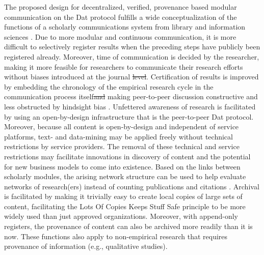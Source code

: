 \documentclass[publications,article,submit,moreauthors,pdftex,10pt,a4paper]{Definitions/mdpi}
\providecommand{\DIFaddtex}[1]{{\protect\color{blue}\uwave{#1}}} %
\providecommand{\DIFdeltex}[1]{{\protect\color{red}\sout{#1}}}                      %
\providecommand{\DIFaddbegin}{} %
\providecommand{\DIFaddend}{} %
\providecommand{\DIFdelbegin}{} %
\providecommand{\DIFdelend}{} %
\providecommand{\DIFadd}[1]{\texorpdfstring{\DIFaddtex{#1}}{#1}} %
\providecommand{\DIFdel}[1]{\texorpdfstring{\DIFdeltex{#1}}{}} %
\newcommand{\DIFscaledelfig}{0.5}
\newlength{\DIFdelgraphicswidth} %
\newlength{\DIFdelgraphicsheight} %
\newcommand{\DIFaddincludegraphics}[2][]{{\color{blue}\fbox{\DIFOincludegraphics[#1]{#2}}}} %
\newcommand{\DIFdelincludegraphics}[2][]{%
\sbox{\DIFdelgraphicsbox}{\DIFOincludegraphics[#1]{#2}}%
\settoboxwidth{\DIFdelgraphicswidth}{\DIFdelgraphicsbox} %
\settoboxtotalheight{\DIFdelgraphicsheight}{\DIFdelgraphicsbox} %
\scalebox{\DIFscaledelfig}{%
\parbox[b]{\DIFdelgraphicswidth}{\usebox{\DIFdelgraphicsbox}\\[-\baselineskip] \rule{\DIFdelgraphicswidth}{0em}}\llap{\resizebox{\DIFdelgraphicswidth}{\DIFdelgraphicsheight}{%
\setlength{\unitlength}{\DIFdelgraphicswidth}%
\begin{picture}(1,1)%
\thicklines\linethickness{2pt} %
{\color[rgb]{1,0,0}\put(0,0){\framebox(1,1){}}}%
{\color[rgb]{1,0,0}\put(0,0){\line( 1,1){1}}}%
{\color[rgb]{1,0,0}\put(0,1){\line(1,-1){1}}}%
\end{picture}%
}\hspace*{3pt}}} %
} %
\DeclareRobustCommand{\DIFaddbegin}{\DIFOaddbegin \let\includegraphics\DIFaddincludegraphics} %
\DeclareRobustCommand{\DIFaddend}{\DIFOaddend \let\includegraphics\DIFOincludegraphics} %
\DeclareRobustCommand{\DIFdelbegin}{\DIFOdelbegin \let\includegraphics\DIFdelincludegraphics} %
\DeclareRobustCommand{\DIFdelend}{\DIFOaddend \let\includegraphics\DIFOincludegraphics} %
\begin{document}
The proposed design for decentralized, verified, provenance based
modular communication on the Dat protocol fulfills a wide
conceptualization of the functions of a scholarly communications
system from library and information sciences
\citep{roosendaal1998,doi:10.1045/september2004-vandesompel}. Due to
more modular and continuous communication, it is more difficult to
selectively register results when the preceding steps have publicly
been registered already. Moreover, time of communication is decided by
the researcher, making it more feasible for researchers to communicate
their research efforts without biases introduced at the journal
\DIFdelbegin \DIFdel{level}\DIFdelend \DIFaddbegin \DIFadd{stage}\DIFaddend . Certification of results is improved by embedding the
chronology of the empirical research cycle in the communication
process itself\DIFdelbegin \DIFdel{and }\DIFdelend \DIFaddbegin \DIFadd{, }\DIFaddend making peer-to-peer discussion constructive and less
obstructed by hindsight bias
\citep{doi:10.1037/1089-2680.2.2.175}. Unfettered awareness of
research is facilitated by using an open-by-design infrastructure that
is the peer-to-peer Dat protocol. Moreover, because all content is
open-by-design and independent of service platforms, text- and
data-mining may be applied freely without technical restrictions by
service providers. The removal of these technical and service
restrictions may facilitate innovations in discovery of content and
the potential for new business models to come into existence. Based on
the links between scholarly modules, the arising network structure can
be used to help evaluate networks of research(ers) instead of counting
publications and citations \citep{doi:10.3390/publications6020021}.
Archival is facilitated by making it trivially easy to create local
copies of large sets of content, facilitating the Lots Of Copies Keeps
Stuff Safe
\citep[LOCKSS;][]{doi:10.1045/june2001-reich,doi:10.1103/physreve.95.022313}
principle to be more widely used than just approved
organizations. Moreover, with append-only registers, the provenance of
content can also be archived more readily than it is now. These
functions also apply to non-empirical research that requires
provenance of information (e.g., qualitative studies).
\end{document}
